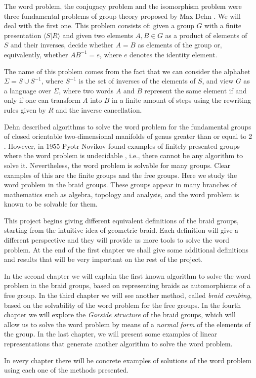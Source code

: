 \documentclass[TFG.tex]{subfiles}
\begin{document}

The word problem, the conjugacy problem and the isomorphism problem were three fundamental problems of group theory proposed by Max Dehn \cite{Dehn11}. We will deal with the first one. This problem consists of: given a group $G$ with a finite presentation $\langle S|R\rangle$ and given two elements $A,B\in G$ as a product of elements of $S$ and their inverses, decide whether $A=B$ as elements of the group or, equivalently, whether $AB^{-1}=e$, where $e$ denotes the identity element. 

The name of this problem comes from the fact that we can consider the alphabet $\Sigma=S\cup S^{-1}$, where $S^{-1}$ is the set of inverses of the elements of $S$, and view $G$ as a language over $\Sigma$, where two words $A$ and $B$ represent the same element if and only if one can transform $A$ into $B$ in a finite amount of steps using the rewriting rules given by $R$ and the inverse cancellation. 

Dehn described algorithms to solve the word problem for the fundamental groups of closed orientable two-dimensional manifolds of genus greater than or equal to 2 \cite{Dehn12}. However, in 1955 Pyotr Novikov found examples of finitely presented groups where the word problem is undecidable \cite{Novikov}, i.e., there cannot be any algorithm to solve it. Nevertheless, the word problem is solvable for many groups. Clear examples of this are the finite groups and the free groups. Here we study the word problem in the braid groups. These groups appear in many branches of mathematics such as algebra, topology and analysis, and the word problem is known to be solvable for them.  

This project begins giving different equivalent definitions of the braid groups, starting from the intuitive idea of geometric braid. Each definition will give a different perspective and they will provide us more tools to solve the word problem. At the end of the first chapter we shall give some additional definitions and results that will be very important on the rest of the project.

In the second chapter we will explain the first known algorithm to solve the word problem in the braid groups, based on representing braids as automorphisms of a free group. In the third chapter we will see another method, called \emph{braid combing}, based on the solvability of the word problem for the free groups. In the fourth chapter we will explore the \emph{Garside structure} of the braid groups, which will allow us to solve the word problem by means of a \emph{normal form} of the elements of the group. In the last chapter, we will present some examples of linear representations that generate another algorithm to solve the word problem. 

In every chapter there will be concrete examples of solutions of the word problem using each one of the methods presented.
\end{document}

